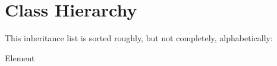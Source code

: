 \section{Class Hierarchy}
This inheritance list is sorted roughly, but not completely, alphabetically\+:\begin{DoxyCompactList}
\item Element\begin{DoxyCompactList}
\item {}
\item {}
\end{DoxyCompactList}
\item {}
\item {}
\item {}
\end{DoxyCompactList}
